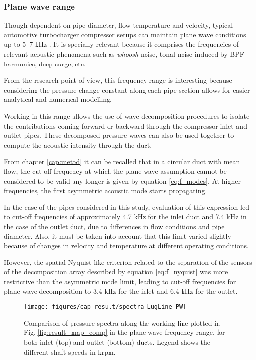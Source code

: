 \subsubsection{Plane wave range}

Though dependent on pipe diameter, flow temperature and velocity, typical automotive turbocharger compressor setups can maintain plane wave conditions up to 5--7 kHz \cite{gaude2008experimental}. It is specially relevant because it comprises the frequencies of relevant acoustic phenomena such as \emph{whoosh} noise, tonal noise induced by BPF harmonics, deep surge, etc.

From the research point of view, this frequency range is interesting because considering the pressure change constant along each pipe section allows for easier analytical and numerical modelling. 

Working in this range allows the use of wave decomposition procedures to isolate the contributions coming forward or backward through the compressor inlet and outlet pipes. These decomposed pressure waves can also be used together to compute the acoustic intensity through the duct.

From chapter \ref{cap:metod} it can be recalled that in a circular duct with mean flow, the cut-off frequency at which the plane wave assumption cannot be considered to be valid any longer is given by equation \ref{eq:f_modes}. At higher frequencies, the first asymmetric acoustic mode starts propagating.

In the case of the pipes considered in this study, evaluation of this expression led to cut-off frequencies of approximately 4.7 kHz for the inlet duct and 7.4 kHz in the case of the outlet duct, due to differences in flow conditions and pipe diameter. Also, it must be taken into account that this limit varied slightly because of changes in velocity and temperature at different operating conditions.

However, the spatial Nyquist-like criterion related to the separation of the sensors of the decomposition array described by equation \ref{eq:f_nyquist} was more restrictive than the asymmetric mode limit, leading to cut-off frequencies for plane wave decomposition to 3.4 kHz for the inlet and 6.4 kHz for the outlet.

\begin{figure}[tbh!]
\centering
\texttt{[image: figures/cap\_result/spectra\_LugLine\_PW]}
\caption[Spectra along the working line in the plane wave range]{Comparison of pressure spectra along the working line plotted in Fig. \ref{fig:result_map_comp} in the plane wave frequency range, for both inlet (top) and outlet (bottom) ducts. Legend shows the different shaft speeds in krpm.}
\label{fig:result_spectra_LugLine_PW}
\end{figure}

